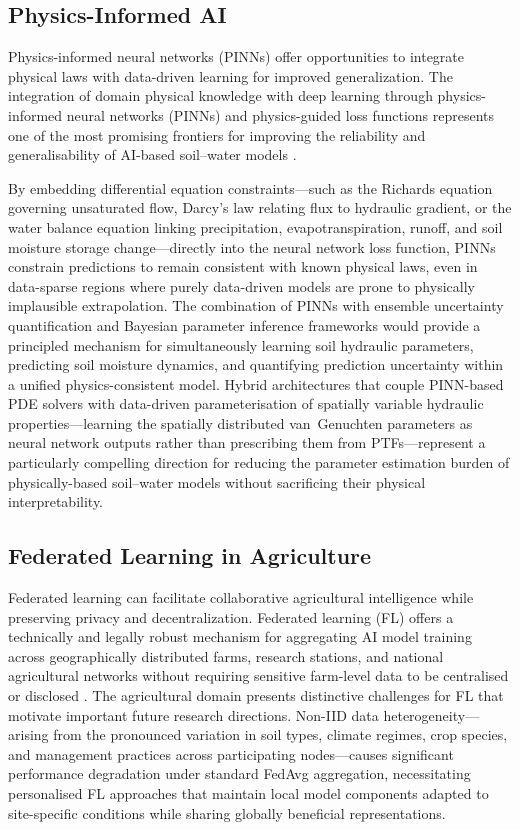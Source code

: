 \documentclass[land,article,submit,pdftex,moreauthors]{Definitions/mdpi}
\numberwithin{equation}{section}
\begin{document}
\subsection{Physics-Informed AI}

Physics-informed neural networks (PINNs) offer opportunities to integrate physical laws with data-driven learning for improved generalization. The integration of domain physical knowledge with deep learning through physics-informed neural networks (PINNs) and physics-guided loss functions represents one of the most promising frontiers for improving the reliability and generalisability of AI-based soil--water models \citep{karniadakis2021physics}. 

By embedding differential equation constraints---such as the Richards equation governing unsaturated flow, Darcy's law relating flux to hydraulic gradient, or the water balance equation linking precipitation, evapotranspiration, runoff, and soil moisture storage change---directly into the neural network loss function, PINNs constrain predictions to remain consistent with known physical laws, even in data-sparse regions where purely data-driven models are prone to physically implausible extrapolation.  The combination of PINNs with ensemble uncertainty quantification and Bayesian parameter inference frameworks would provide a principled mechanism for simultaneously learning soil hydraulic parameters, predicting soil moisture dynamics, and quantifying prediction uncertainty within a unified physics-consistent model. Hybrid architectures that couple PINN-based PDE solvers with data-driven parameterisation of spatially variable hydraulic properties---learning the spatially distributed van~Genuchten parameters as neural network outputs rather than prescribing them from PTFs---represent a particularly compelling direction for reducing the parameter estimation burden of physically-based soil--water models without sacrificing their physical interpretability.

\subsection{Federated Learning in Agriculture}

Federated learning can facilitate collaborative agricultural intelligence while preserving privacy and decentralization. Federated learning (FL) offers a technically and legally robust mechanism for aggregating AI model training across geographically distributed farms, research stations, and national agricultural networks without requiring sensitive farm-level data to be centralised or disclosed \citep{mcmahan2017communication}. The agricultural domain presents distinctive challenges for FL that motivate important future research directions. Non-IID data heterogeneity---arising from the pronounced variation in soil types, climate regimes, crop species, and management practices across participating nodes---causes significant performance degradation under standard FedAvg aggregation, necessitating personalised FL approaches that maintain local model components adapted to site-specific conditions while sharing globally beneficial representations. 
\end{document}
